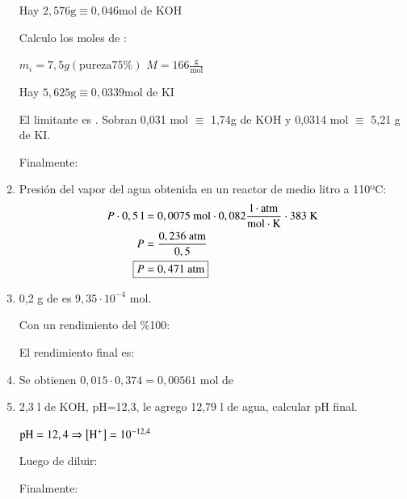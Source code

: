 \begin{enumerate}
\hfil
Hay $2,576\text{g} \equiv 0,046 \text{mol}$ de KOH
\hfil

Calculo los moles de :

\hfil $m_i = 7,5g (\text{pureza}75\%)$
\hfil $M = 166\frac{\text{g}}{\text{mol}}$
\hfil

\hfil
Hay $5,625\text{g} \equiv 0,0339 \text{mol}$ de KI
\hfil

El limitante es . Sobran 0,031 mol $\equiv$ 1,74g de KOH y 0,0314 mol $\equiv$ 5,21 g de KI.

Finalmente: 

\hfil
{}
\hfil


\item Presión del vapor del agua obtenida en un reactor de medio litro a 110ºC:
\begin{align*}
    P \cdot 0,5 \text{ l} &= 0,0075 \text{ mol} \cdot 0,082 \frac{\text{l}\cdot \text{atm}}{\text{mol} \cdot \text{K}} \cdot 383 \text{ K}\\
    P &= \dfrac{0,236 \text{ atm}}{0,5}\\
    \Aboxed{P &= 0,471\text{ atm}}
\end{align*}


\newpage
\item 0,2 g de  es $9,35\cdot 10^{-4}$ mol.

Con un rendimiento del \%100:

El rendimiento final es:

\hfil{}\hfil


\item Se obtienen $0,015\cdot 0,374 = 0,00561$ mol de 
\hfil{}
\hfil


\item 2,3 l de KOH, pH=12,3, le agrego 12,79 l de agua, calcular pH final.

\hfil $\text{pH}=12,4 \Rightarrow \left[\ce{H^+}\right] = 10^{-12,4} $
\hfil
{}

Luego de diluir:

Finalmente:

\hfil {}\hfil



\end{enumerate}
